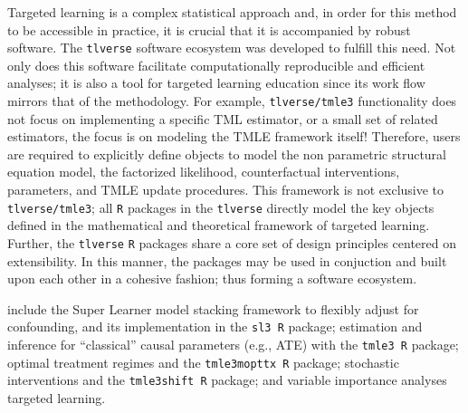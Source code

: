 \documentclass[a4paper,11pt]{texMemo}
\newcommand{\note}[2][]{\added[#1,remark={#2}]{}}
\begin{document}
Targeted learning is a complex statistical approach and, in order for this method to be accessible in practice, it is crucial that it is accompanied by robust software. The \texttt{tlverse} software ecosystem was developed to fulfill this need. Not only does this software facilitate computationally reproducible and efficient analyses; it is also a tool for targeted learning education since its work flow mirrors that of the methodology. For example, \texttt{tlverse/tmle3} functionality does not focus on implementing a specific TML estimator, or a small set of related estimators, the focus is on modeling the TMLE framework itself! Therefore, users are required to explicitly define objects to model the non parametric structural equation model, the factorized likelihood, counterfactual interventions, parameters, and TMLE update procedures. This framework is not exclusive to \texttt{tlverse/tmle3}; all \texttt{R} packages in the \texttt{tlverse} directly model the key objects defined in the mathematical and theoretical framework of targeted learning. Further, the \texttt{tlverse} \texttt{R} packages share a core set of design principles centered on extensibility. In this manner, the packages may be used in conjuction and built upon each other in a cohesive fashion; thus forming a software ecosystem. 

\pagebreak

\note[id=RP]{Not sure if we should include the information below that details the topics to be presented. It's not really motivation/rationale and we present it later in the sample schedule}

 include the Super Learner model stacking framework to flexibly adjust for confounding, and its implementation in the \texttt{sl3 R} package; estimation and inference for ``classical'' causal parameters (e.g., ATE) with
the \texttt{tmle3 R} package; optimal treatment regimes and the \texttt{tmle3mopttx R} package; stochastic interventions and the \texttt{tmle3shift R} package; and variable importance analyses   targeted learning.
\end{document}
